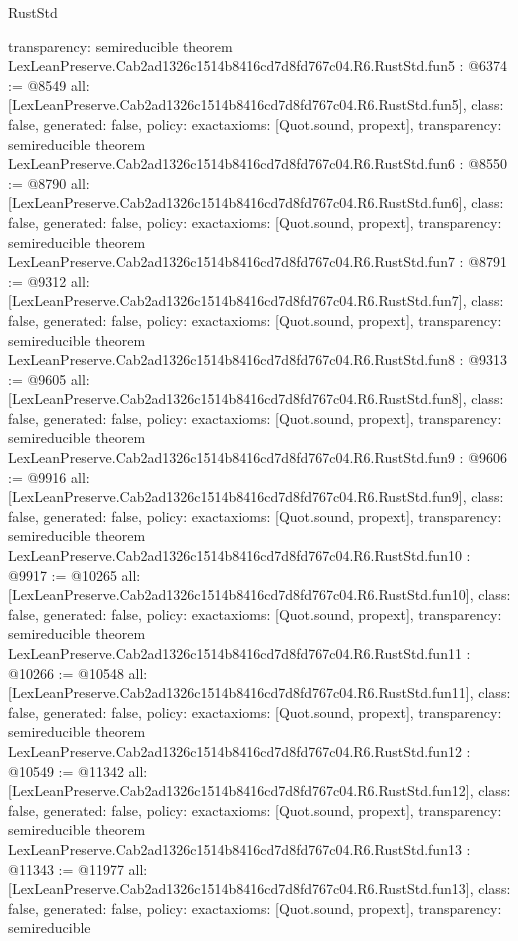 \begin{lexlean}{RustStd}
\begin{coremodule}
{  transparency: semireducible
}
theorem LexLeanPreserve.Cab2ad1326c1514b8416cd7d8fd767c04.R6.RustStd.fun5 : @6374 := @8549 {
  all: [LexLeanPreserve.Cab2ad1326c1514b8416cd7d8fd767c04.R6.RustStd.fun5],
  class: false,
  generated: false,
  policy: exact{axioms: [Quot.sound, propext]},
  transparency: semireducible
}
theorem LexLeanPreserve.Cab2ad1326c1514b8416cd7d8fd767c04.R6.RustStd.fun6 : @8550 := @8790 {
  all: [LexLeanPreserve.Cab2ad1326c1514b8416cd7d8fd767c04.R6.RustStd.fun6],
  class: false,
  generated: false,
  policy: exact{axioms: [Quot.sound, propext]},
  transparency: semireducible
}
theorem LexLeanPreserve.Cab2ad1326c1514b8416cd7d8fd767c04.R6.RustStd.fun7 : @8791 := @9312 {
  all: [LexLeanPreserve.Cab2ad1326c1514b8416cd7d8fd767c04.R6.RustStd.fun7],
  class: false,
  generated: false,
  policy: exact{axioms: [Quot.sound, propext]},
  transparency: semireducible
}
theorem LexLeanPreserve.Cab2ad1326c1514b8416cd7d8fd767c04.R6.RustStd.fun8 : @9313 := @9605 {
  all: [LexLeanPreserve.Cab2ad1326c1514b8416cd7d8fd767c04.R6.RustStd.fun8],
  class: false,
  generated: false,
  policy: exact{axioms: [Quot.sound, propext]},
  transparency: semireducible
}
theorem LexLeanPreserve.Cab2ad1326c1514b8416cd7d8fd767c04.R6.RustStd.fun9 : @9606 := @9916 {
  all: [LexLeanPreserve.Cab2ad1326c1514b8416cd7d8fd767c04.R6.RustStd.fun9],
  class: false,
  generated: false,
  policy: exact{axioms: [Quot.sound, propext]},
  transparency: semireducible
}
theorem LexLeanPreserve.Cab2ad1326c1514b8416cd7d8fd767c04.R6.RustStd.fun10 : @9917 := @10265 {
  all: [LexLeanPreserve.Cab2ad1326c1514b8416cd7d8fd767c04.R6.RustStd.fun10],
  class: false,
  generated: false,
  policy: exact{axioms: [Quot.sound, propext]},
  transparency: semireducible
}
theorem LexLeanPreserve.Cab2ad1326c1514b8416cd7d8fd767c04.R6.RustStd.fun11 : @10266 := @10548 {
  all: [LexLeanPreserve.Cab2ad1326c1514b8416cd7d8fd767c04.R6.RustStd.fun11],
  class: false,
  generated: false,
  policy: exact{axioms: [Quot.sound, propext]},
  transparency: semireducible
}
theorem LexLeanPreserve.Cab2ad1326c1514b8416cd7d8fd767c04.R6.RustStd.fun12 : @10549 := @11342 {
  all: [LexLeanPreserve.Cab2ad1326c1514b8416cd7d8fd767c04.R6.RustStd.fun12],
  class: false,
  generated: false,
  policy: exact{axioms: [Quot.sound, propext]},
  transparency: semireducible
}
theorem LexLeanPreserve.Cab2ad1326c1514b8416cd7d8fd767c04.R6.RustStd.fun13 : @11343 := @11977 {
  all: [LexLeanPreserve.Cab2ad1326c1514b8416cd7d8fd767c04.R6.RustStd.fun13],
  class: false,
  generated: false,
  policy: exact{axioms: [Quot.sound, propext]},
  transparency: semireducible
}
\end{coremodule}
\end{lexlean}
